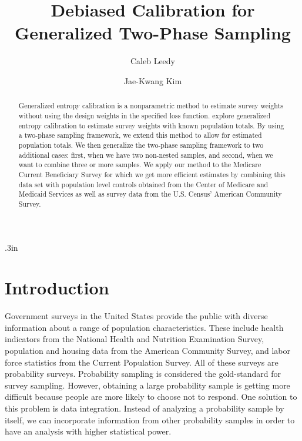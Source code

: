 \documentclass[12pt]{article}
\begin{document}
\title{Debiased Calibration for Generalized Two-Phase Sampling}
\author{Caleb Leedy \and Jae-Kwang Kim}
\maketitle 

\baselineskip .3in

\begin{abstract}
Generalized entropy calibration \citep{gneiting2007strictly} is a nonparametric
method to estimate survey weights without using the design weights in the
specified loss function. \cite{kwon2024debiased} explore generalized
entropy calibration to estimate survey weights with known population totals.
By using a two-phase sampling framework, we extend this method to allow for
estimated population totals. We then generalize the two-phase sampling framework to
two additional cases: first, when we have two non-nested samples, and
second, when we want to combine three or more samples. 
We apply our method to the Medicare Current Beneficiary Survey for which we
get more efficient estimates by combining this data set with population level
controls obtained from the Center of Medicare and Medicaid Services as well as
survey data from the U.S. Census' American Community Survey.
\end{abstract}

\newpage

\section{Introduction}

Government surveys in the United States provide the public with diverse
information about a range of population characteristics. These include health
indicators from the National Health and Nutrition Examination Survey, population
and housing data from the American Community Survey, and labor force statistics
from the Current Population Survey. All of these surveys are probability
surveys. Probability sampling is considered the
gold-standard for survey sampling. However, obtaining a large probability
sample is getting more difficult because people are more likely to choose not to
respond. One solution to this problem is data integration. Instead of analyzing
a probability sample by itself, we can incorporate information from other
probability samples in order to have an analysis with higher statistical power.
\end{document}
